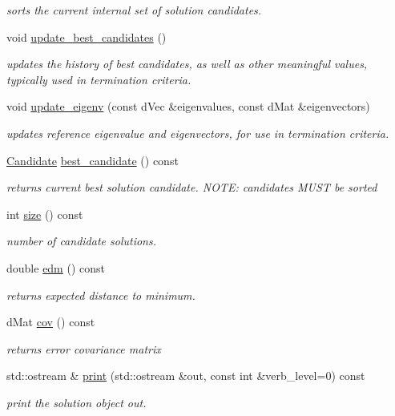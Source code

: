 \begin{DoxyCompactItemize}
\begin{DoxyCompactList}\small\item\em sorts the current internal set of solution candidates. \end{DoxyCompactList}\item 
void \hyperlink{classlibcmaes_1_1CMASolutions_a207c159be5f8668f018d564a1adb8dc8}{update\-\_\-best\-\_\-candidates} ()
\begin{DoxyCompactList}\small\item\em updates the history of best candidates, as well as other meaningful values, typically used in termination criteria. \end{DoxyCompactList}\item 
void \hyperlink{classlibcmaes_1_1CMASolutions_a28a20c0a90712e4f28038af2a4bd320b}{update\-\_\-eigenv} (const d\-Vec \&eigenvalues, const d\-Mat \&eigenvectors)
\begin{DoxyCompactList}\small\item\em updates reference eigenvalue and eigenvectors, for use in termination criteria. \end{DoxyCompactList}\item 
\hyperlink{classlibcmaes_1_1Candidate}{Candidate} \hyperlink{classlibcmaes_1_1CMASolutions_a218f2ee7bbd91d385f23082bfe18b1d9}{best\-\_\-candidate} () const 
\begin{DoxyCompactList}\small\item\em returns current best solution candidate. N\-O\-T\-E\-: candidates M\-U\-S\-T be sorted \end{DoxyCompactList}\item 
int \hyperlink{classlibcmaes_1_1CMASolutions_a7a7e71c54967613717d2928a38715429}{size} () const 
\begin{DoxyCompactList}\small\item\em number of candidate solutions. \end{DoxyCompactList}\item 
double \hyperlink{classlibcmaes_1_1CMASolutions_a33a5f2f6bc03c9b459d58f079a1a2d38}{edm} () const 
\begin{DoxyCompactList}\small\item\em returns expected distance to minimum. \end{DoxyCompactList}\item 
d\-Mat \hyperlink{classlibcmaes_1_1CMASolutions_a8b3cd4f1b85c820190eedbf81f49a441}{cov} () const 
\begin{DoxyCompactList}\small\item\em returns error covariance matrix \end{DoxyCompactList}\item 
std\-::ostream \& \hyperlink{classlibcmaes_1_1CMASolutions_a6efb92b35de0ffa6cbe5918c82469db2}{print} (std\-::ostream \&out, const int \&verb\-\_\-level=0) const 
\begin{DoxyCompactList}\small\item\em print the solution object out. \end{DoxyCompactList}\end{DoxyCompactItemize}
